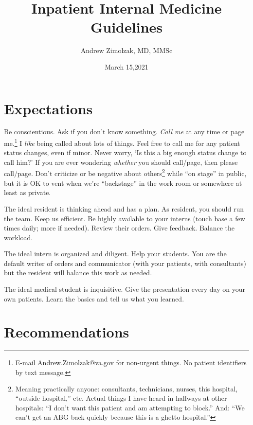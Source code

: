 \documentclass{tufte-handout}
\title{Inpatient Internal Medicine Guidelines}
\author{Andrew Zimolzak, MD, MMSc}
\date{March 15,2021}
\begin{document}
\maketitle

\section{Expectations}

Be conscientious. Ask if you don't know something. \emph{Call me} at
any time or page me.\footnote{E-mail
Andrew.Zimolzak@va.gov for non-urgent things. No patient identifiers
by text message.} I \emph{like} being called about lots of things.
Feel free to call me for any patient status changes, even if minor.
Never worry, `Is this a big enough status change to call him?' If you
are ever wondering \emph{whether} you should call/page, then please
call/page. Don't criticize or be negative about
others\footnote{Meaning practically anyone: consultants, technicians,
nurses, this hospital, ``outside hospital,'' etc. Actual things I have
heard in hallways at other hospitals: ``I don't want this patient and
am attempting to block.'' And: ``We can't get an ABG back quickly
because this is a ghetto hospital.''} while ``on stage'' in public,
but it is OK to vent when we're ``backstage'' in the work room or
somewhere at least as private.

The ideal resident is thinking ahead and has a plan. As resident, you
should run the team. Keep us efficient. Be highly available to your
interns (touch base a few times daily; more if needed). Review their
orders. Give feedback. Balance the workload.

The ideal intern is organized and diligent. Help your students. You
are the default writer of orders and communicator (with your patients,
with consultants) but the resident will balance this work as needed.

The ideal medical student is inquisitive. Give the presentation every
day on your own patients. Learn the basics and tell us what you
learned.

\section{Recommendations}

\end{document}
